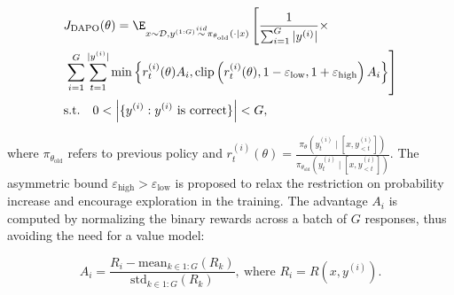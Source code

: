 \vspace{-15pt}
\begin{small}
\begin{align*}
&J_{\text{DAPO}}(\theta)=\E_{x \sim \mathcal{D},y^{(1:G)} \overset{iid}{\sim} \pi_{\theta_{\text{old}}}(\cdot\mid x)} 
\left[\frac{1}{\sum_{i=1}^G |y^{(i)}|}\times\right.\\
&\left.\sum_{i=1}^G\sum_{t=1}^{|y^{(i)}|}\min\left\{r^{(i)}_{t}(\theta)A_i,\mathrm{clip}\left(r^{(i)}_{t}(\theta),1-\varepsilon_{\text{low}},1+\varepsilon_{\text{high}}\right)A_i\right\}
\right]\\
&\mathrm{s.t.}\quad 0<\left|\{y^{(i)}:y^{(i)}\mathrm{~is~correct}\}\right|<G,
\end{align*}
\end{small}
\vspace{-15pt}

where $\pi_{\theta_{\text{old}}}$ refers to previous policy and $r^{(i)}_{t}(\theta)=\frac{\pi_{\theta}(y^{(i)}_{t} \mid [x, y^{(i)}_{<t}])}{\pi_{\theta_{\text{old}}}(y^{(i)}_{t} \mid [x, y^{(i)}_{<t}])}$.  The asymmetric bound $\varepsilon_{\text{high}} > \varepsilon_{\text{low}}$ is proposed to relax the restriction on probability increase and encourage exploration in the training. 
The advantage $A_i$ is computed by normalizing the binary rewards across a batch of $G$ responses, thus avoiding the need for a value model:

\vspace{-15pt}
\begin{small}
\begin{equation*}
A_i=\frac{R_i-\mathrm{mean}_{k\in 1:G}(R_k)}{\mathrm{std}_{k\in 1:G}(R_k)},~
\text{where } R_i=R(x,y^{(i)}).
\end{equation*}
\end{small}
\vspace{-15pt}

%

